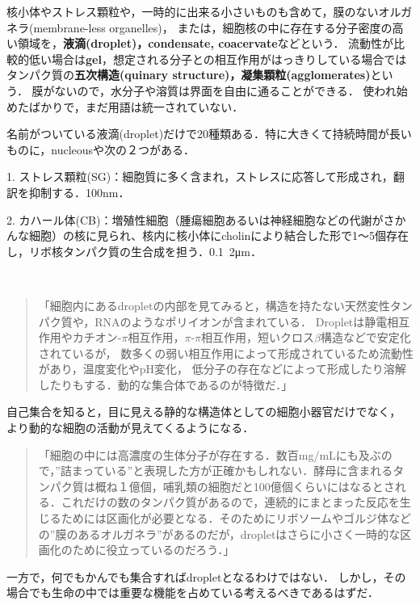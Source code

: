 \documentclass[uplatex, dvipdfmx]{jsreport}
\begin{document}
\begin{definition}[droplet]
    核小体やストレス顆粒や，一時的に出来る小さいものも含めて，膜のないオルガネラ(membrane-less organelles)，
    または，細胞核の中に存在する分子密度の高い領域を，\textbf{液滴(droplet)，condensate, coacervate}などという．
    流動性が比較的低い場合は\textbf{gel}，想定される分子との相互作用がはっきりしている場合では
    タンパク質の\textbf{五次構造(quinary structure)，凝集顆粒(agglomerates)}という．
    膜がないので，水分子や溶質は界面を自由に通ることができる．
    使われ始めたばかりで，まだ用語は統一されていない．
\end{definition}
\begin{example}
    名前がついている液滴(droplet)だけで20種類ある．特に大きくて持続時間が長いものに，nucleousや次の２つがある．

    1. ストレス顆粒(SG)：細胞質に多く含まれ，ストレスに応答して形成され，翻訳を抑制する．100nm．

    2. カハール体(CB)：増殖性細胞（腫瘍細胞あるいは神経細胞などの代謝がさかんな細胞）の核に見られ、核内に核小体にcholinにより結合した形で1〜5個存在し，リボ核タンパク質の生合成を担う．0.1~2μm．
\end{example}
\begin{remark}[Droplet自体が広義の超分子である]　

    \begin{quotation}
        「細胞内にあるdropletの内部を見てみると，構造を持たない天然変性タンパク質や，RNAのようなポリイオンが含まれている．
        Dropletは静電相互作用やカチオン-$\pi$相互作用，$\pi$-$\pi$相互作用，短いクロス$\beta$構造などで安定化されているが，
        数多くの弱い相互作用によって形成されているため流動性があり，温度変化やpH変化，
        低分子の存在などによって形成したり溶解したりもする．動的な集合体であるのが特徴だ．」\cite{白木賢太郎}
    \end{quotation}
\end{remark}

自己集合を知ると，目に見える静的な構造体としての細胞小器官だけでなく，
より動的な細胞の活動が見えてくるようになる．
\begin{quote}
    「細胞の中には高濃度の生体分子が存在する．数百mg/mLにも及ぶので，”詰まっている”と表現した方が正確かもしれない．酵母に含まれるタンパク質は概ね１億個，哺乳類の細胞だと100億個くらいにはなるとされる．これだけの数のタンパク質があるので，連続的にまとまった反応を生じるためには区画化が必要となる．そのためにリボソームやゴルジ体などの”膜のあるオルガネラ”があるのだが，dropletはさらに小さく一時的な区画化のために役立っているのだろう．」\cite{白木賢太郎}
\end{quote}
一方で，何でもかんでも集合すればdropletとなるわけではない．
しかし，その場合でも生命の中では重要な機能を占めている考えるべきであるはずだ．
\end{document}
